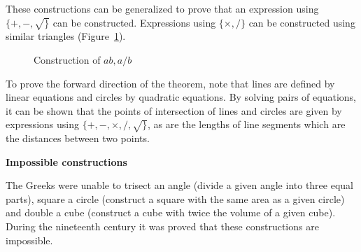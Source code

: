 \documentclass[a4paper,11pt]{article}
\begin{document}
These constructions can be generalized to prove that an expression using $\{+,-,\surd\}$ can be constructed. Expressions using $\{\times,/\}$ can be constructed using similar triangles
(Figure~\ref{fig.times-div}).
\begin{figure}[htb]
\begin{center}
\caption{Construction of $ab,a/b$}\label{fig.times-div}
\end{center}
\end{figure}

To prove the forward direction of the theorem, note that lines are defined by linear equations and circles by quadratic equations. By solving pairs of equations, it can be shown that the points of intersection of lines and circles are given by expressions using $\{+,-,\times,/,\surd\}$, as are the lengths of line segments which are the distances between two points.

\textbf{Impossible constructions}

The Greeks were unable to trisect an angle (divide a given angle into three equal parts), square a circle (construct a square with the same area as a given circle) and double a cube (construct a cube with twice the volume of a given cube). During the nineteenth century it was proved that these constructions are impossible.
\end{document}
